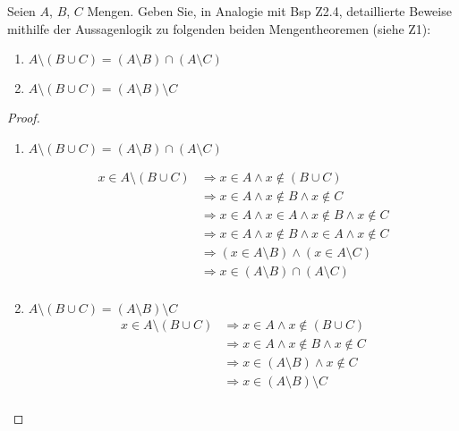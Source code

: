 \documentclass{../problemset}
\author{Michael van Straten}
\begin{document}
\maketitle

\begin{problem}
Seien $A$, $B$, $C$ Mengen. Geben Sie, in Analogie mit Bsp Z2.4, detaillierte Beweise mithilfe der Aussagenlogik zu folgenden beiden Mengentheoremen (siehe Z1):
\begin{enumerate}
	\item $A \setminus (B \cup C) = (A \setminus B) \cap (A \setminus C)$
	\item $A \setminus (B \cup C) = (A \setminus B) \setminus C$
\end{enumerate}
\begin{proof}
	\begin{enumerate}
		\item $A \setminus (B \cup C) = (A \setminus B) \cap (A \setminus C)$

		      \begin{align*}
			      x \in A \setminus (B \cup C) & \Longrightarrow x \in A \land x \not \in (B \cup C)                         \\
			                                   & \Longrightarrow x \in A \land x \not \in B \land x \not \in C               \\
			                                   & \Longrightarrow x \in A \land x \in A \land x \not \in B \land x \not \in C \\
			                                   & \Longrightarrow x \in A \land x \not \in B \land x \in A \land x \not \in C \\
			                                   & \Longrightarrow (x \in A \setminus B) \land (x \in A \setminus C)           \\
			                                   & \Longrightarrow x \in (A \setminus B) \cap (A \setminus C) \tag{\checkmark} \\
		      \end{align*}

		\item $A \setminus (B \cup C) = (A \setminus B) \setminus C$
		      \begin{align*}
			      x \in A \setminus (B \cup C) & \Longrightarrow x \in A \land x \not\in (B \cup C)                 \\
			                                   & \Longrightarrow x \in A \land x \not\in B \land x \not\in C        \\
			                                   & \Longrightarrow x \in (A \setminus B) \land x \not\in C            \\
			                                   & \Longrightarrow x \in (A \setminus B) \setminus C \tag{\checkmark} \\
		      \end{align*}
	\end{enumerate}
\end{proof}
\end{problem}
\end{document}
